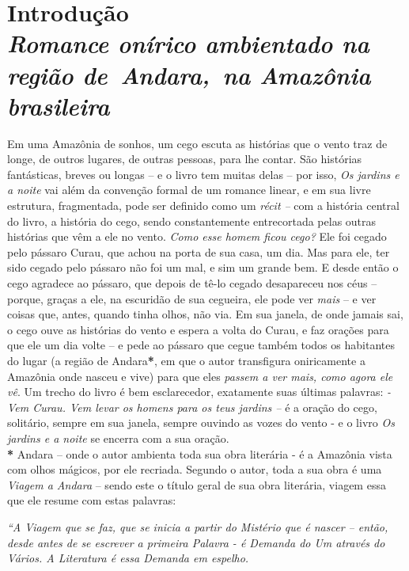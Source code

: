 \chapter*{Introdução\\
\emph{Romance onírico ambientado na região de~Andara,~na Amazônia brasileira}}



Em uma Amazônia de sonhos, um cego escuta as histórias que o vento traz
de longe, de outros lugares, de outras pessoas, para lhe contar. São
histórias fantásticas, breves ou longas -- e o livro tem muitas delas --
por isso, \emph{Os jardins e a noite} vai além da convenção formal de um
romance linear, e em sua livre estrutura, fragmentada, pode ser definido
como um \emph{récit --} com a história central do livro, a história do
cego, sendo constantemente entrecortada pelas outras histórias que vêm a
ele no vento. \emph{Como esse homem ficou cego?} Ele foi cegado pelo
pássaro Curau, que achou na porta de sua casa, um dia. Mas para ele, ter
sido cegado pelo pássaro não foi um mal, e sim um grande bem. E desde
então o cego agradece ao pássaro, que depois de tê-lo cegado desapareceu
nos céus -- porque, graças a ele, na escuridão de sua cegueira, ele pode
ver \emph{mais} -- e ver coisas que, antes, quando tinha olhos, não via.
Em sua janela, de onde jamais sai, o cego ouve as histórias do vento e
espera a volta do Curau, e faz orações para que ele um dia volte -- e
pede ao pássaro que cegue também todos os habitantes do lugar (a região
de Andara\textbf{*}, em que o autor transfigura oniricamente a Amazônia
onde nasceu e vive) para que eles \emph{passem a ver mais, como agora
ele vê}. Um trecho do livro é bem esclarecedor, exatamente suas últimas
palavras: \emph{- Vem Curau. Vem levar os homens para os teus jardins
--} é a oração do cego, solitário, sempre em sua janela, sempre ouvindo
as vozes do vento - e o livro \emph{Os jardins e a noite} se encerra com
a sua oração.\\


\textbf{*} Andara -- onde o autor ambienta toda sua obra literária - é a
Amazônia vista com olhos mágicos, por ele recriada. Segundo o autor,
toda a sua obra é uma \emph{Viagem a Andara} -- sendo este o título
geral de sua obra literária, viagem essa que ele resume com estas
palavras:

\emph{``A Viagem que se faz, que se inicia a partir do Mistério que é
nascer -- então, desde antes de se escrever a primeira Palavra - é
Demanda do Um através do Vários. A Literatura é essa Demanda em espelho.
}

